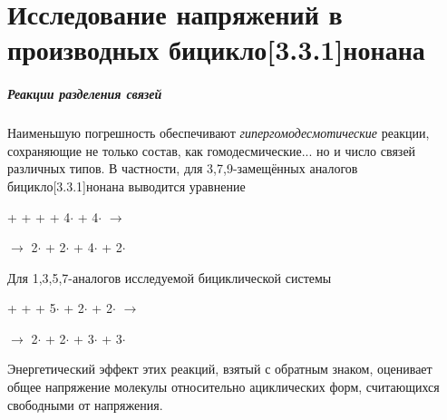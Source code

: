 \chapter{Исследование напряжений в производных бицикло[3.3.1]нонана}

\paragraph{Реакции разделения связей} Наименьшую погрешность обеспечивают \emph{гипергомодесмотические} реакции, сохраняющие не только состав, как гомодесмические... но и число связей различных типов. В частности, для 3,7,9-замещённых аналогов бицикло[3.3.1]нонана выводится уравнение
\begin{center}
  +  +  +  + 4\(\cdot\) 
  + 4\(\cdot\)
  \(\longrightarrow\)
  
  \(\longrightarrow\) 
  2\(\cdot\) + 2\(\cdot\) + 4\(\cdot\) + 
  2\(\cdot\)
\end{center}

Для 1,3,5,7-аналогов исследуемой бициклической системы
\begin{center}
  +  +  + 5\(\cdot\) 
  + 2\(\cdot\)
  + 2\(\cdot\)
  \(\longrightarrow\)
  
  \(\longrightarrow\) 
  2\(\cdot\) + 2\(\cdot\) + 3\(\cdot\) + 3\(\cdot\)
\end{center}

Энергетический эффект этих реакций, взятый с обратным знаком, оценивает общее напряжение молекулы относительно ациклических форм, считающихся свободными от напряжения. 

